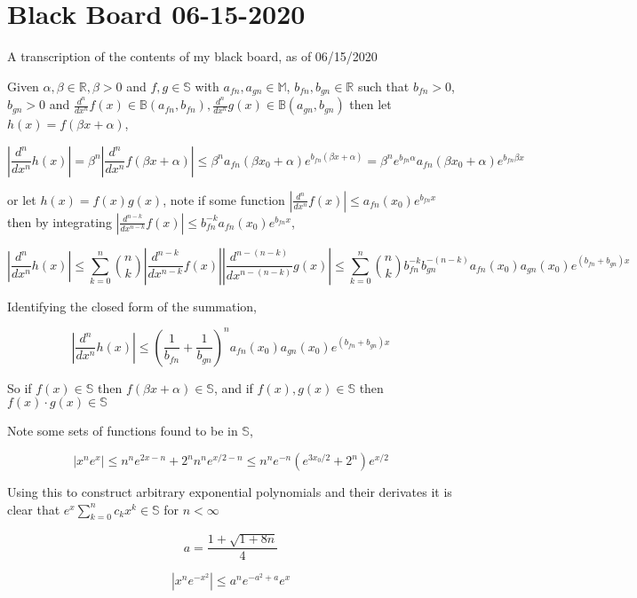 \documentclass[%
 preprint,
 amsmath, amssymb, aps, pra, 10pt
]{revtex4-2}
\begin{document}
\section{Black Board 06-15-2020}

A transcription of the contents of my black board, as of 06/15/2020

Given $\alpha, \beta \in \mathbb{R}, \beta > 0$ and $f, g \in \mathbb{S}$ with $a_{fn}, a_{gn} \in \mathbb{M}$, $ b_{fn}, b_{gn} \in \mathbb{R}$ such that $b_{fn} > 0$, $b_{gn} > 0$ and $\frac{d^n}{dx^n} f(x) \in \mathbb{B}(a_{fn}, b_{fn}), \frac{d^n}{dx^n} g(x) \in \mathbb{B}(a_{gn}, b_{gn})$ then let $h(x) = f(\beta x + \alpha)$,

\[\left| \frac{d^n}{dx^n}h(x) \right| = \beta^n \left| \frac{d^n}{dx^n}f(\beta x + \alpha) \right| \leq \beta^n a_{fn}(\beta x_0 + \alpha)e^{b_{fn}(\beta x + \alpha)} = \beta^n e^{b_{fn}\alpha} a_{fn}(\beta x_0 + \alpha)e^{b_{fn}\beta x}\]

or let $h(x) = f(x)g(x)$, note if some function $\left| \frac{d^n}{dx^n}f(x) \right| \leq a_{fn}(x_0)e^{b_{fn}x}$ then by integrating $\left| \frac{d^{n-k}}{dx^{n-k}}f(x) \right| \leq b_{fn}^{-k}a_{fn}(x_0)e^{b_{fn}x}$,

\[\left| \frac{d^n}{dx^n}h(x) \right| \leq \sum_{k=0}^n \binom{n}{k}\left| \frac{d^{n-k}}{dx^{n-k}}f(x) \right|\left| \frac{d^{n-(n-k)}}{dx^{n-(n-k)}}g(x) \right| \leq \sum_{k = 0}^n \binom{n}{k}b_{fn}^{-k}b_{gn}^{-(n-k)}a_{fn}(x_0)a_{gn}(x_0)e^{(b_{fn} + b_{gn})x} \]

Identifying the closed form of the summation,

\[\left| \frac{d^n}{dx^n}h(x) \right| \leq \left(\frac{1}{b_{fn}} + \frac{1}{b_{gn}} \right)^n a_{fn}(x_0)a_{gn}(x_0) e^{(b_{fn} + b_{gn})x}\]

So if $f(x) \in \mathbb{S}$ then $f(\beta x + \alpha) \in \mathbb{S}$, and if $f(x), g(x) \in \mathbb{S}$ then $f(x)\cdot g(x) \in \mathbb{S}$

Note some sets of functions found to be in $\mathbb{S}$,

\[\left| x^ne^x \right| \leq n^n e^{2x - n} + 2^n n^n e^{x/2 - n} \leq n^n e^{-n}\left(e^{3x_0/2} + 2^n\right)e^{x/2}\]

Using this to construct arbitrary exponential polynomials and their derivates it is clear that $e^x\sum_{k=0}^n c_k x^k \in \mathbb{S}$ for $n<\infty$

\[a = \frac{1 + \sqrt{1 + 8n}}{4}\]

\[\left|x^n e^{-x^2}\right| \leq a^n e^{-a^2+a}e^x\]
\end{document}

